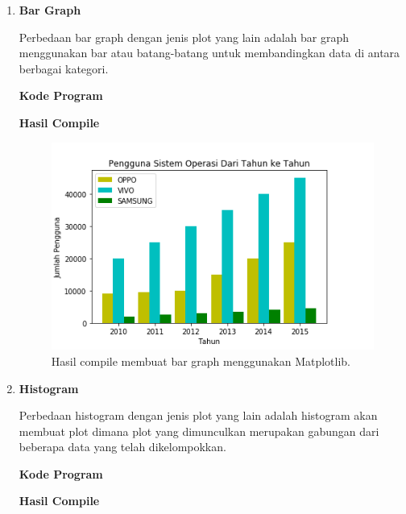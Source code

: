\begin{enumerate}
	\item \textbf{Bar Graph}
	
	Perbedaan bar graph dengan jenis plot yang lain adalah bar graph menggunakan bar atau batang-batang untuk membandingkan data di antara berbagai kategori.
	
	\textbf{Kode Program}
	
	
	
	\textbf{Hasil Compile}
	
	\begin{figure}[H]
		\includegraphics[width=12cm]{figures/6/1174026/3,1.png}
		\centering
		\caption{Hasil compile membuat bar graph menggunakan Matplotlib.}
	\end{figure}
	
	\item \textbf{Histogram}
	
	Perbedaan histogram dengan jenis plot yang lain adalah histogram akan membuat plot dimana plot yang dimunculkan merupakan gabungan dari beberapa data yang telah dikelompokkan.
	
	\textbf{Kode Program}
	
	
	
	\textbf{Hasil Compile}
	

\end{enumerate}
